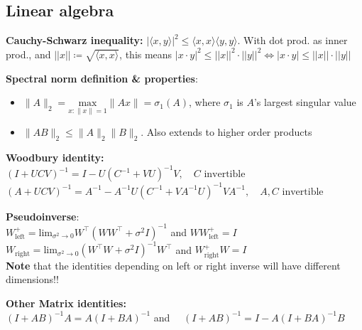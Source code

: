 \subsection{Linear algebra}
\textbf{Cauchy-Schwarz inequality:} $|\langle x, y\rangle|^2 \leq \langle x,x \rangle \langle y,y \rangle$. With dot prod. as inner prod., and $||x|| \coloneqq \sqrt{\langle x,x\rangle}$, this means $|x \cdot y|^2 \leq ||x||^2\cdot||y||^2 \iff |x \cdot y| \leq ||x||\cdot||y||$

\textbf{Spectral norm definition \& properties}:
\begin{itemize}
    \item $\lVert A\rVert_2 = \underset{x: \lVert x\rVert =1}{\text{max}} \lVert Ax\rVert = \sigma_1(A)$, where $\sigma_1$ is $A$'s largest singular value
    \item $\lVert AB\rVert_2 \leq \lVert A\rVert_2 \lVert B\rVert_2$. Also extends to higher order products
\end{itemize}

\textbf{Woodbury identity:}\\
\((I+UCV)^{-1}=I-U(C^{-1} + VU)^{-1}V,\quad C\text{ invertible}\)\\
\((A+UCV)^{-1}=A^{-1}-A^{-1}U(C^{-1}+VA^{-1}U)^{-1}VA^{-1}, \quad A, C\text{ invertible}\)

\textbf{Pseudoinverse}: \\
$W_{\text{left}}^{+} = \text{lim}_{\sigma^2 \rightarrow0}W^{\top}(WW^{\top}+\sigma^2I)^{-1}$ and $WW_{\text{left}}^{+} = I$\\
$W_{\text{right}} = \text{lim}_{\sigma^2 \rightarrow0}(W^{\top}W+\sigma^2I)^{-1}W^{\top}$ and $W_{\text{right}}^{+}W = I$\\
\textbf{Note} that the identities depending on left or right inverse will have different dimensions!! 


\textbf{Other Matrix identities:}\\ 
\((I+AB)^{-1}A=A(I+BA)^{-1}\) and \(\quad (I+AB)^{-1}=I-A(I+BA)^{-1}B\)


